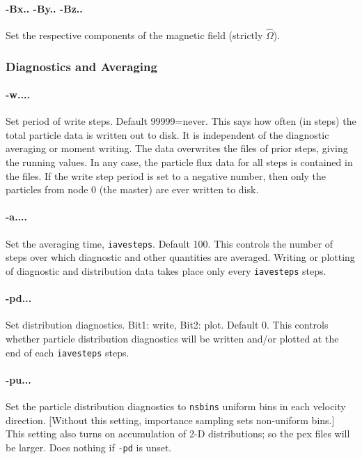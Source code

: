 \documentclass[12pt]{article}
\begin{document}
\paragraph{-Bx.. -By.. -Bz..} Set the respective components of the
magnetic field (strictly $\hat\Omega$). 

\subsubsection*{Diagnostics and Averaging}

\paragraph{-w....}  Set period of write steps. Default 99999=never.
This says how often (in steps) the total particle data is written out to
disk. It is independent of the diagnostic averaging or moment writing.
The data overwrites the files of prior steps, giving the running
values. In any case, the particle flux data for all steps is contained in
the files. If the write step period is set to a negative number, then
only the particles from node 0 (the master) are ever
written to disk. 

\paragraph{-a....}  Set the averaging time, \verb!iavesteps!. Default 100.
This controls the number of steps over which diagnostic and other
quantities are averaged. Writing or plotting of diagnostic and
distribution data takes place only every \verb!iavesteps! steps.

\paragraph{-pd...}
Set distribution diagnostics. Bit1: write, Bit2: plot. Default 0.
This controls whether particle distribution diagnostics will be
written and/or plotted at the end of each \verb!iavesteps! steps. 

\paragraph{-pu...}
Set the particle distribution diagnostics to \verb!nsbins! uniform
bins in each velocity direction. [Without this setting, importance
sampling sets non-uniform bins.] This setting also turns on
accumulation of 2-D distributions; so the pex files will be larger.
Does nothing if \verb!-pd! is unset.
\end{document}

